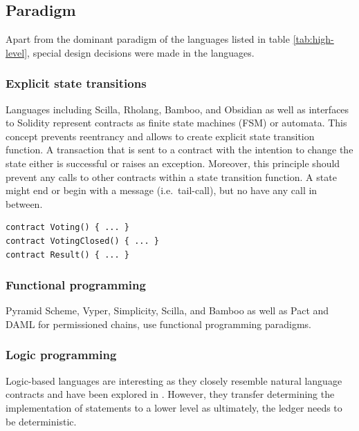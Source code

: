 \subsection{Paradigm}
Apart from the dominant paradigm of the languages listed in table \ref{tab:high-level}, special design decisions were made in the languages.

\subsubsection{Explicit state transitions}
Languages including Scilla, Rholang, Bamboo, and Obsidian as well as interfaces to Solidity \cite{Mavridou2018} represent contracts as finite state machines (FSM) or automata. This concept prevents reentrancy and allows to create explicit state transition function. A transaction that is sent to a contract with the intention to change the state either is successful or raises an exception. Moreover, this principle should prevent any calls to other contracts within a state transition function. A state might end or begin with a message (i.e.\ tail-call), but no have any call in between.

\begin{lstlisting}[caption={A separation of states represented in Bamboo, where each state represents a different contract at the same address.},label=lst:fsm,language=Solidity]
contract Voting() { ... }
contract VotingClosed() { ... }
contract Result() { ... }
\end{lstlisting}

\subsubsection{Functional programming}
Pyramid Scheme, Vyper, Simplicity, Scilla, and Bamboo as well as Pact and DAML for permissioned chains, use functional programming paradigms.

\subsubsection{Logic programming}
Logic-based languages are interesting as they closely resemble natural language contracts and have been explored in \cite{Idelberger2016}. However, they transfer determining the implementation of statements to a lower level as ultimately, the ledger needs to be deterministic.

